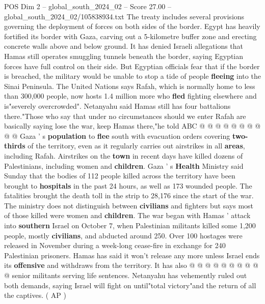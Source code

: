 \begin{textsample}{POS Dim 2 – global\_south\_2024\_02 – Score 27.00 – global\_south\_2024\_02/105838934.txt}
The treaty includes several provisions governing the deployment of forces on both sides of the border.
Egypt has heavily fortified its border with Gaza, carving out a 5-kilometre buffer zone and erecting concrete walls above and below ground.
It has denied Israeli allegations that Hamas still operates smuggling tunnels beneath the border, saying Egyptian forces have full control on their side.
But Egyptian officials fear that if the border is breached, the military would be unable to stop a tide of people \textbf{fleeing} into the Sinai Peninsula.
The United Nations says Rafah, which is normally home to less than 300,000 people, now hosts 1.4 million more who \textbf{fled} fighting elsewhere and is"severely overcrowded".
Netanyahu said Hamas still has four battalions there."Those who say that under no circumstances should we enter Rafah are basically saying lose the war, keep Hamas there,"he told ABC @ @ @ @ @ @ @ @ @ @ Gaza ' s \textbf{population} to \textbf{flee} south with evacuation orders covering \textbf{two-thirds} of the territory, even as it regularly carries out airstrikes in all \textbf{areas}, including Rafah.
Airstrikes on the \textbf{town} in recent days have killed dozens of Palestinians, including women and \textbf{children}.
Gaza ' s \textbf{Health} Ministry said Sunday that the bodies of 112 people killed across the territory have been brought to \textbf{hospitals} in the past 24 hours, as well as 173 wounded people.
The fatalities brought the death toll in the strip to 28,176 since the start of the war.
The ministry does not distinguish between \textbf{civilians} and fighters but says most of those killed were women and \textbf{children}.
The war began with Hamas ' attack into \textbf{southern} Israel on October 7, when Palestinian militants killed some 1,200 people, mostly \textbf{civilians}, and abducted around 250.
Over 100 hostages were released in November during a week-long cease-fire in exchange for 240 Palestinian prisoners.
Hamas has said it won't release any more unless Israel ends its \textbf{offensive} and withdraws from the territory.
It has also @ @ @ @ @ @ @ @ @ @ senior militants serving life sentences.
Netanyahu has vehemently ruled out both demands, saying Israel will fight on until"total victory"and the return of all the captives. ( AP )

\end{textsample}
